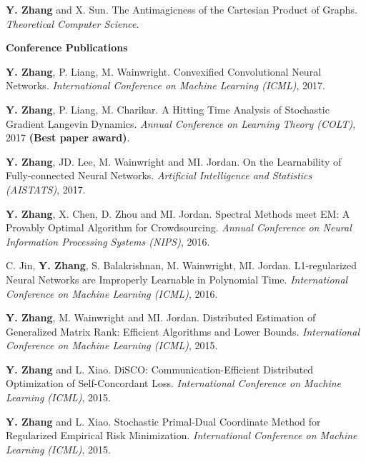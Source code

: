 \documentclass[11pt]{res} %
\begin{document}
{\begin{resume}
\begin{enumerate}[ {[J}1{]} ]
\item \textbf{Y. Zhang} and X. Sun. The Antimagicness of the Cartesian Product of Graphs.
\emph{Theoretical Computer Science}.
\end{enumerate}

{\Large\bf Conference Publications}
\vspace{5pt}

\begin{enumerate}[ {[C}1{]} ]

\item  \textbf{Y. Zhang}, P. Liang, M. Wainwright. Convexified Convolutional Neural Networks.
\emph{International Conference on Machine Learning (ICML)}, 2017.

\item  \textbf{Y. Zhang}, P. Liang, M. Charikar. A Hitting Time Analysis of Stochastic Gradient Langevin Dynamics.
\emph{Annual Conference on Learning Theory (COLT)}, 2017 {\bf (Best paper award)}.

\item \textbf{Y. Zhang}, JD. Lee, M. Wainwright and MI. Jordan. On the Learnability of Fully-connected Neural Networks.
\emph{Artificial Intelligence and Statistics (AISTATS)}, 2017.

\item \textbf{Y. Zhang}, X. Chen, D. Zhou and MI. Jordan. Spectral Methods meet EM: A Provably Optimal Algorithm for Crowdsourcing.
\emph{Annual Conference on Neural Information Processing Systems (NIPS)}, 2016.

\item C. Jin, \textbf{Y. Zhang}, S. Balakrishnan, M. Wainwright, MI. Jordan. L1-regularized Neural Networks are Improperly Learnable in Polynomial Time.
\emph{International Conference on Machine Learning (ICML)}, 2016.

\item \textbf{Y. Zhang}, M. Wainwright and MI. Jordan. Distributed Estimation of Generalized Matrix Rank: Efficient Algorithms and Lower Bounds.
\emph{International Conference on Machine Learning (ICML)}, 2015.

\item \textbf{Y. Zhang} and L. Xiao. DiSCO: Communication-Efficient Distributed Optimization of Self-Concordant Loss.
\emph{International Conference on Machine Learning (ICML)}, 2015.

\item \textbf{Y. Zhang} and L. Xiao. Stochastic Primal-Dual Coordinate Method for Regularized Empirical Risk Minimization.
\emph{International Conference on Machine Learning (ICML)}, 2015.


\end{enumerate}
\end{resume}}
\end{document}
